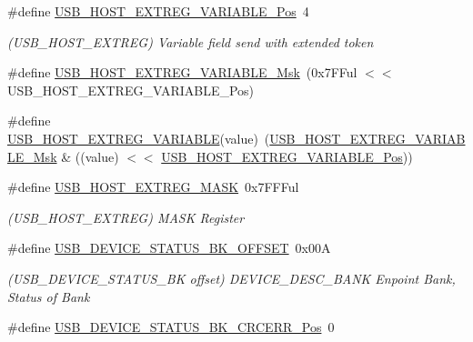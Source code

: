 \begin{DoxyCompactItemize}
\item 
\#define \mbox{\hyperlink{group___s_a_m_d21___u_s_b_ga518a47e5a0c791287a3f79373d6f542d}{U\+S\+B\+\_\+\+H\+O\+S\+T\+\_\+\+E\+X\+T\+R\+E\+G\+\_\+\+V\+A\+R\+I\+A\+B\+L\+E\+\_\+\+Pos}}~4
\begin{DoxyCompactList}\small\item\em (U\+S\+B\+\_\+\+H\+O\+S\+T\+\_\+\+E\+X\+T\+R\+EG) Variable field send with extended token \end{DoxyCompactList}\item 
\#define \mbox{\hyperlink{group___s_a_m_d21___u_s_b_gae4a6b9c9c67891e3f6a6a7cbc868c686}{U\+S\+B\+\_\+\+H\+O\+S\+T\+\_\+\+E\+X\+T\+R\+E\+G\+\_\+\+V\+A\+R\+I\+A\+B\+L\+E\+\_\+\+Msk}}~(0x7\+F\+Ful $<$$<$ U\+S\+B\+\_\+\+H\+O\+S\+T\+\_\+\+E\+X\+T\+R\+E\+G\+\_\+\+V\+A\+R\+I\+A\+B\+L\+E\+\_\+\+Pos)
\item 
\#define \mbox{\hyperlink{group___s_a_m_d21___u_s_b_ga32983f17d81fb14830bebcc1abecbb06}{U\+S\+B\+\_\+\+H\+O\+S\+T\+\_\+\+E\+X\+T\+R\+E\+G\+\_\+\+V\+A\+R\+I\+A\+B\+LE}}(value)~(\mbox{\hyperlink{group___s_a_m_d21___u_s_b_gae4a6b9c9c67891e3f6a6a7cbc868c686}{U\+S\+B\+\_\+\+H\+O\+S\+T\+\_\+\+E\+X\+T\+R\+E\+G\+\_\+\+V\+A\+R\+I\+A\+B\+L\+E\+\_\+\+Msk}} \& ((value) $<$$<$ \mbox{\hyperlink{group___s_a_m_d21___u_s_b_ga518a47e5a0c791287a3f79373d6f542d}{U\+S\+B\+\_\+\+H\+O\+S\+T\+\_\+\+E\+X\+T\+R\+E\+G\+\_\+\+V\+A\+R\+I\+A\+B\+L\+E\+\_\+\+Pos}}))
\item 
\#define \mbox{\hyperlink{group___s_a_m_d21___u_s_b_gaf97a5b4e113d17d4b5404bef611ce388}{U\+S\+B\+\_\+\+H\+O\+S\+T\+\_\+\+E\+X\+T\+R\+E\+G\+\_\+\+M\+A\+SK}}~0x7\+F\+F\+Ful
\begin{DoxyCompactList}\small\item\em (U\+S\+B\+\_\+\+H\+O\+S\+T\+\_\+\+E\+X\+T\+R\+EG) M\+A\+SK Register \end{DoxyCompactList}\item 
\#define \mbox{\hyperlink{group___s_a_m_d21___u_s_b_ga9d12246fa3ef16dbf5d1454bb2880adb}{U\+S\+B\+\_\+\+D\+E\+V\+I\+C\+E\+\_\+\+S\+T\+A\+T\+U\+S\+\_\+\+B\+K\+\_\+\+O\+F\+F\+S\+ET}}~0x00A
\begin{DoxyCompactList}\small\item\em (U\+S\+B\+\_\+\+D\+E\+V\+I\+C\+E\+\_\+\+S\+T\+A\+T\+U\+S\+\_\+\+BK offset) D\+E\+V\+I\+C\+E\+\_\+\+D\+E\+S\+C\+\_\+\+B\+A\+NK Enpoint Bank, Status of Bank \end{DoxyCompactList}\item 
\#define \mbox{\hyperlink{group___s_a_m_d21___u_s_b_gad308ade50b904627335d19830484de2d}{U\+S\+B\+\_\+\+D\+E\+V\+I\+C\+E\+\_\+\+S\+T\+A\+T\+U\+S\+\_\+\+B\+K\+\_\+\+C\+R\+C\+E\+R\+R\+\_\+\+Pos}}~0

\end{DoxyCompactItemize}
